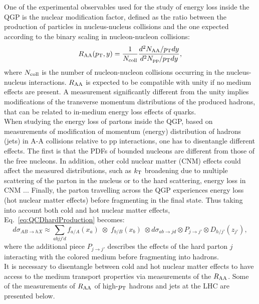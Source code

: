 One of the experimental observables used for the study of energy loss
 inside the QGP is the nuclear modification factor, defined as the ratio 
 between the production of particles in nucleus-nucleus collisions and 
 the one expected according to the binary scaling in nucleon-nucleon collisions:
\begin{equation}
\label{eq:Raa}
R_{\rm AA} (p_{\rm T}, y) = \frac{1}{N_{\rm coll}}\frac{d^2N_{\rm AA}/p_{\rm T} dy}{d^2N_{\rm pp}/p_{\rm T} dy},
\end{equation}
where $N_{\rm coll}$ is the number of nucleon-nucleon collisions occurring
in the nucleus-nucleus interactions. $R_{\rm AA}$ is expected to be compatible 
with unity if no medium effects are present. A measurement significantly 
different from the unity implies modifications of the transverse momentum 
distributions of the produced hadrons, that can be related to in-medium 
energy loss effects of quarks.\\


When studying the energy loss of partons inside the QGP, based on
measurements of modification of momentum (energy) distribution of hadrons (jets)
in A-A collisions relative to pp interactions, one 
has to disentangle different effects. The first is that the PDFs of 
bounded nucleons are different from those of the free nucleons. In addition, 
other cold nuclear matter (CNM) effects could affect the measured distributions,
such as $k_{\rm T}$ broadening due to multiple scattering of the
parton in the nucleus or to the hard scattering, energy loss in CNM ... 
Finally, the parton travelling 
  across the QGP experiences energy loss (hot nuclear matter effects) 
  before fragmenting in the final state. Thus taking into account both cold and hot nuclear matter effects, 
Eq.~\ref{eq:QCDhardProduction} becomes:
\begin{equation}
\label{eq:QCDwNuclEffects}
d\sigma_{AB\rightarrow hX} \approx \sum_{abjj\prime d} f_{a/A} (x_a) \; \otimes \;f_{b/B} (x_b) \;\otimes d\sigma_{ab\rightarrow jd} \otimes P_{j\rightarrow j\prime} \otimes D_{h/j\prime}(z_{j\prime}), 
\end{equation}
where the additional piece $P_{j\rightarrow j\prime}$ describes the 
effects of the hard parton $j$ interacting with the colored medium 
before fragmenting into hadrons. \\

It is necessary to disentangle between cold and hot nuclear matter 
effects to have access to the medium transport properties via
 measurements of the $R_{\rm AA}$. Some of the measurements of $R_{\rm AA}$
  of high-$p_{\rm T}$ hadrons and jets at the LHC are presented below.

